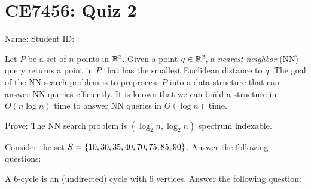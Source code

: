 


\usepackage{amsfonts, amsmath, amssymb, amsthm}
\usepackage{comment}
\usepackage{graphicx}
\usepackage{ifthen}
\usepackage{latexsym}
\usepackage[normalem]{ulem}



\def\dom{\prec}
\def\T{\mathcal{T}}




\section*{CE7456: Quiz 2}

\noindent Name:  \hspace{50mm}
Student ID:


\extraspacing


 Let $P$ be a set of $n$ points in $\mathbb{R}^2$. Given a point $q \in \mathbb{R}^2$, a {\em nearest neighbor} (NN) query returns a point in $P$ that has the smallest Euclidean distance to $q$. The goal of the NN search problem is to preprocess $P$ into a data structure that can answer NN queries efficiently. It is known that we can build a structure in $O(n \log n)$ time to answer NN queries in $O(\log n)$ time.

\vgap

Prove: The NN search problem is $(\log_2 n, \log_2 n)$ spectrum indexable.

\pagebreak

 Consider the set $S = \{10, 30, 35, 40, 70, 75, 85, 90\}$. Answer the following questions:


\pagebreak

 A 6-cycle is an (undirected) cycle with 6 vertices. Answer the following question:


